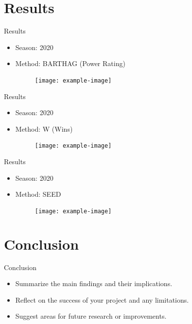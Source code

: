 \documentclass{beamer}
\begin{document}
\section{Results}

\begin{frame}{Results}
\begin{itemize}
  \item Season: 2020 
  \item Method: BARTHAG (Power Rating)
  
      \begin{figure}
      \centering
      \texttt{[image: example-image]} %
    \end{figure}
    
\end{itemize}
\end{frame}

\begin{frame}{Results}
\begin{itemize}
  \item Season: 2020 
  \item Method: W (Wins)
  
      \begin{figure}
      \centering
      \texttt{[image: example-image]} %
    \end{figure}
    
\end{itemize}
\end{frame}

\begin{frame}{Results}
\begin{itemize}
  \item Season: 2020 
  \item Method: SEED
  
      \begin{figure}
      \centering
      \texttt{[image: example-image]} %
    \end{figure}
    
\end{itemize}
\end{frame}

\section{Conclusion}

\begin{frame}{Conclusion}
\begin{itemize}
  \item Summarize the main findings and their implications.
  \item Reflect on the success of your project and any limitations.
  \item Suggest areas for future research or improvements.
\end{itemize}
\end{frame}
\end{document}
